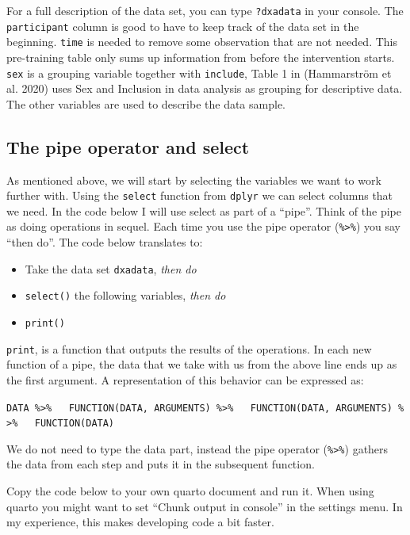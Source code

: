 \documentclass[
  11pt,
  letterpaper,
]{scrbook}
\providecommand{\tightlist}{%
  \setlength{\itemsep}{0pt}\setlength{\parskip}{0pt}}\usepackage{longtable,booktabs,array}
\begin{document}
For a full description of the data set, you can type \texttt{?dxadata}
in your console. The \texttt{participant} column is good to have to keep
track of the data set in the beginning. \texttt{time} is needed to
remove some observation that are not needed. This pre-training table
only sums up information from before the intervention starts.
\texttt{sex} is a grouping variable together with \texttt{include},
Table 1 in (Hammarström et al. 2020) uses Sex and Inclusion in data
analysis as grouping for descriptive data. The other variables are used
to describe the data sample.

\hypertarget{the-pipe-operator-and-select}{%
\subsection{The pipe operator and
select}\label{the-pipe-operator-and-select}}

As mentioned above, we will start by selecting the variables we want to
work further with. Using the \texttt{select} function from
\texttt{dplyr} we can select columns that we need. In the code below I
will use select as part of a ``pipe''. Think of the pipe as doing
operations in sequel. Each time you use the pipe operator
(\texttt{\%\textgreater{}\%}) you say ``then do''. The code below
translates to:

\begin{itemize}
\tightlist
\item
  Take the data set \texttt{dxadata}, \emph{then do}
\item
  \texttt{select()} the following variables, \emph{then do}
\item
  \texttt{print()}
\end{itemize}

\texttt{print}, is a function that outputs the results of the
operations. In each new function of a pipe, the data that we take with
us from the above line ends up as the first argument. A representation
of this behavior can be expressed as:

\texttt{DATA\ \%\textgreater{}\%\ \ \ FUNCTION(DATA,\ ARGUMENTS)\ \%\textgreater{}\%\ \ \ FUNCTION(DATA,\ ARGUMENTS)\ \%\textgreater{}\%\ \ \ FUNCTION(DATA)}

We do not need to type the data part, instead the pipe operator
(\texttt{\%\textgreater{}\%}) gathers the data from each step and puts
it in the subsequent function.

Copy the code below to your own quarto document and run it. When using
quarto you might want to set ``Chunk output in console'' in the settings
menu. In my experience, this makes developing code a bit faster.
\end{document}
